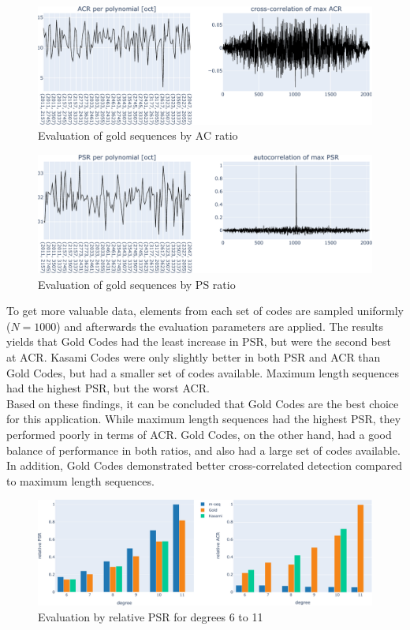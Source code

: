\begin{figure}[h]
	\centering\includegraphics[width=14cm]{images/goldevaacr}
	
	\caption{Evaluation of gold sequences by AC ratio}
	\label{fig:eva}
\end{figure}

\begin{figure}[h]
	\centering\includegraphics[width=14cm]{images/goldevapsr}
	\caption{Evaluation of gold sequences by PS ratio}
	\label{fig:eva}
\end{figure}
To get more valuable data, elements from each set of codes are sampled uniformly ($N=1000$) and afterwards the evaluation parameters are applied.
The results yields that Gold Codes had the least increase in PSR, but were the second best at ACR. Kasami Codes were only slightly better in both PSR and ACR than Gold Codes, but had a smaller set of codes available. Maximum length sequences had the highest PSR, but the worst ACR.\\
Based on these findings, it can be concluded that Gold Codes are the best choice for this application. While maximum length sequences had the highest PSR, they performed poorly in terms of ACR. Gold Codes, on the other hand, had a good balance of performance in both ratios, and also had a large set of codes available. In addition, Gold Codes demonstrated better cross-correlated detection compared to maximum length sequences.
\begin{figure}[h]
	\centering\includegraphics[width=14cm]{images/degCompEva}
	
	\caption{Evaluation by relative PSR for degrees 6 to 11}
	\label{fig:eva}
\end{figure}

%	
